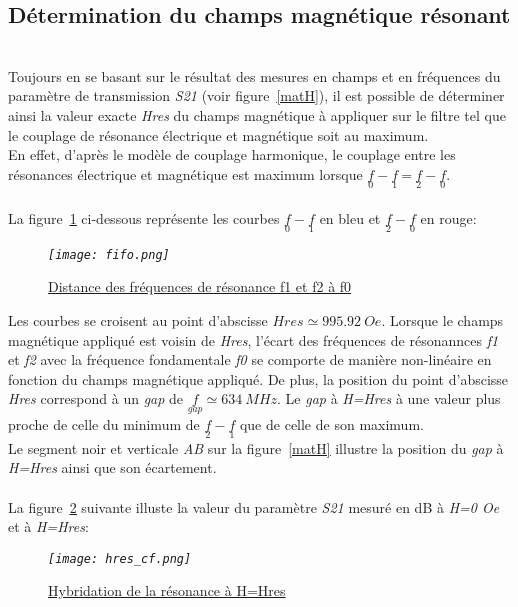 \documentclass[12pt,fleqn]{book} %
\begin{document}
\subsection{Détermination du champs magnétique résonant}
~\\
\noindent Toujours en se basant sur le résultat des mesures en champs et en fréquences du paramètre de transmission \emph{S21} (voir figure~\underline{\color{blue}\ref{matH}}), il est possible de déterminer ainsi la valeur exacte \emph{Hres} du champs magnétique à appliquer sur le filtre tel que le couplage de résonance électrique et magnétique soit au maximum.
~\\En effet, d'après le modèle de couplage harmonique\footnotemark[3], le couplage entre les résonances électrique et magnétique est maximum lorsque $\underset{0}{f}-\underset{1}{f}\ \text{=}\ \underset{2}{f}-\underset{0}{f}$.
~\\\\La figure~\underline{\color{blue}\ref{fifo}} ci-dessous représente les courbes $\underset{0}{f}-\underset{1}{f}$ en bleu et $\underset{2}{f}-\underset{0}{f}$ en rouge:
\begin{figure}[H]
	\centering
	\itshape
	\texttt{[image: fifo.png]}
	\caption{\label{fifo} \underline{Distance des fréquences de résonance f1 et f2 à f0}}
\end{figure}
\noindent Les courbes se croisent au point d'abscisse $ Hres\simeq995.92\ Oe$. Lorsque le champs magnétique appliqué est voisin de \emph{Hres}, l'écart des fréquences de résonannces \emph{f1} et \emph{f2} avec la fréquence fondamentale \emph{f0} se comporte de manière non-linéaire en fonction du champs magnétique appliqué.
De plus, la position du point d'abscisse \emph{Hres} correspond à un \emph{gap} de $ \underset{gap}{f}\simeq634\ MHz$. Le \emph{gap} à \emph{H=Hres} à une valeur plus proche de celle du minimum de $\underset{2}{f}-\underset{1}{f}$ que de celle de son maximum. 
~\\Le segment noir et verticale \emph{AB} sur la figure~\underline{\color{blue}\ref{matH}} illustre la position du \emph{gap} à \emph{H=Hres} ainsi que son écartement.
~\\\\La figure~\underline{\color{blue}\ref{hres_cf}} suivante illuste la valeur du paramètre \emph{S21} mesuré en dB à \emph{H=0 Oe} et à \emph{H=Hres}:
\begin{figure}[H]
	\centering
	\itshape
	\texttt{[image: hres\_cf.png]}
	\caption{\label{hres_cf} \underline{Hybridation de la résonance à H=Hres}}
\end{figure}
\end{document}

